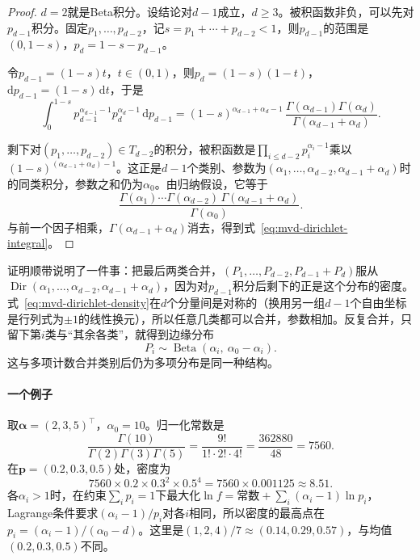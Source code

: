 \begin{proof}
$d=2$就是Beta积分。设结论对$d-1$成立，$d\geq3$。被积函数非负，可以先对$p_{d-1}$积分。固定$p_1,\ldots,p_{d-2}$，记$s=p_1+\cdots+p_{d-2}<1$，则$p_{d-1}$的范围是$(0,1-s)$，$p_d=1-s-p_{d-1}$。

令$p_{d-1}=(1-s)t$，$t\in(0,1)$，则$p_d=(1-s)(1-t)$，$\mathrm{d}p_{d-1}=(1-s)\,\mathrm{d}t$，于是
\[
 \int_0^{1-s}p_{d-1}^{\alpha_{d-1}-1}p_d^{\alpha_d-1}\,\mathrm{d}p_{d-1}=(1-s)^{\alpha_{d-1}+\alpha_d-1}\,\frac{\Gamma(\alpha_{d-1})\Gamma(\alpha_d)}{\Gamma(\alpha_{d-1}+\alpha_d)} .
\]

剩下对$(p_1,\ldots,p_{d-2})\in T_{d-2}$的积分，被积函数是$\prod_{i\leq d-2}p_i^{\alpha_i-1}$乘以$(1-s)^{(\alpha_{d-1}+\alpha_d)-1}$。这正是$d-1$个类别、参数为$(\alpha_1,\ldots,\alpha_{d-2},\alpha_{d-1}+\alpha_d)$时的同类积分，参数之和仍为$\alpha_0$。由归纳假设，它等于
\[
 \frac{\Gamma(\alpha_1)\cdots\Gamma(\alpha_{d-2})\,\Gamma(\alpha_{d-1}+\alpha_d)}{\Gamma(\alpha_0)} .
\]
与前一个因子相乘，$\Gamma(\alpha_{d-1}+\alpha_d)$消去，得到式~\eqref{eq:mvd-dirichlet-integral}。
\end{proof}

证明顺带说明了一件事：把最后两类合并，$(P_1,\ldots,P_{d-2},P_{d-1}+P_d)$服从$\operatorname{Dir}(\alpha_1,\ldots,\alpha_{d-2},\alpha_{d-1}+\alpha_d)$，因为对$p_{d-1}$积分后剩下的正是这个分布的密度。式~\eqref{eq:mvd-dirichlet-density}在$d$个分量间是对称的（换用另一组$d-1$个自由坐标是行列式为$\pm1$的线性换元），所以任意几类都可以合并，参数相加。反复合并，只留下第$i$类与“其余各类”，就得到边缘分布
\begin{equation}
 P_i\sim\operatorname{Beta}(\alpha_i,\ \alpha_0-\alpha_i) .
 \label{eq:mvd-dirichlet-marginal}
\end{equation}
这与多项计数合并类别后仍为多项分布是同一种结构。

\paragraph{一个例子}
取$\bm{\alpha}=(2,3,5)^{\top}$，$\alpha_0=10$。归一化常数是
\[
 \frac{\Gamma(10)}{\Gamma(2)\Gamma(3)\Gamma(5)}=\frac{9!}{1!\cdot2!\cdot4!}=\frac{362880}{48}=7560 .
\]
在$\bm{p}=(0.2,0.3,0.5)$处，密度为
\[
 7560\times0.2\times0.3^{2}\times0.5^{4}=7560\times0.001125\approx8.51 .
\]
各$\alpha_i>1$时，在约束$\sum_ip_i=1$下最大化$\ln f=\text{常数}+\sum_i(\alpha_i-1)\ln p_i$，Lagrange条件要求$(\alpha_i-1)/p_i$对各$i$相同，所以密度的最高点在$p_i=(\alpha_i-1)/(\alpha_0-d)$。这里是$(1,2,4)/7\approx(0.14,0.29,0.57)$，与均值$(0.2,0.3,0.5)$不同。

